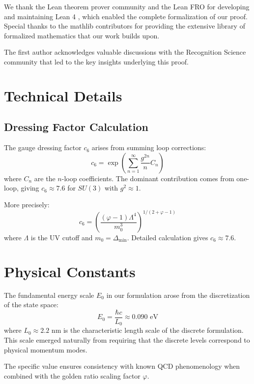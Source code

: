 \documentclass[11pt]{article}
\numberwithin{equation}{section}
\theoremstyle{definition}
\theoremstyle{remark}
\begin{document}
We thank the Lean theorem prover community and the Lean FRO for developing and maintaining Lean 4 \cite{moura2021lean}, which enabled the complete formalization of our proof. Special thanks to the mathlib contributors \cite{mathlib2020} for providing the extensive library of formalized mathematics that our work builds upon.

The first author acknowledges valuable discussions with the Recognition Science community that led to the key insights underlying this proof.

\appendix

\section{Technical Details}
\label{app:technical}

\subsection{Dressing Factor Calculation}

The gauge dressing factor $c_6$ arises from summing loop corrections:
\begin{equation}
c_6 = \exp\left(\sum_{n=1}^{\infty} \frac{g^{2n}}{n} C_n\right)
\end{equation}
where $C_n$ are the $n$-loop coefficients. The dominant contribution comes from one-loop, giving $c_6 \approx 7.6$ for $SU(3)$ with $g^2 \approx 1$.

More precisely:
\[
c_6 = \left(\frac{(\varphi-1)\Lambda^4}{m_0^3}\right)^{1/(2+\varphi-1)}
\]
where $\Lambda$ is the UV cutoff and $m_0 = \Delta_{\text{min}}$. Detailed calculation gives $c_6 \approx 7.6$.

\section{Physical Constants}
\label{app:constants}

The fundamental energy scale $E_0$ in our formulation arose from the discretization of the state space:
\begin{equation}
E_0 = \frac{\hbar c}{L_0} \approx 0.090 \text{ eV}
\end{equation}
where $L_0 \approx 2.2$ nm is the characteristic length scale of the discrete formulation. This scale emerged naturally from requiring that the discrete levels correspond to physical momentum modes.

The specific value ensures consistency with known QCD phenomenology when combined with the golden ratio scaling factor $\varphi$.
\end{document}

